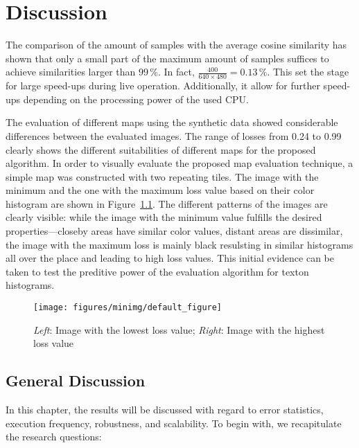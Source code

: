 \chapter{Discussion}
\label{chap:discussion}

The comparison of the amount of samples with the average cosine
similarity has shown that only a small part of the maximum amount of
samples suffices to achieve similarities larger than $99\,\%$. In
fact, $\frac{400}{640 \times 480} = 0.13\,\%$. This set the stage for
large speed-ups during live operation. Additionally, it allow for further speed-ups depending on the processing power of the used
CPU.

The evaluation of different maps using the synthetic data showed
considerable differences between the evaluated images. The range of
losses from 0.24 to 0.99 clearly shows the different suitabilities of different maps for the proposed algorithm. In order to visually evaluate the
proposed map evaluation technique, a simple map was constructed with
two repeating tiles. The image with the minimum and the one with the
maximum loss value based on their color histogram are shown in
Figure~\ref{fig:minmaximg}. The different patterns of the images are
clearly visible: while the image with the minimum value fulfills the
desired properties---closeby areas have similar color values, distant
areas are dissimilar, the image with the maximum loss is mainly black
resulsting in similar histograms all over the place and leading to
high loss values. This initial evidence can be taken to test the
preditive power of the evaluation algorithm for texton histograms.

\begin{figure}[h!]
\begin{center}
\texttt{[image: figures/minimg/default\_figure]}
\caption{{\label{fig:minmaximg} \emph{Left}: Image with the lowest loss value; \emph{Right}:
    Image with the highest loss value%
}}
\end{center}
\end{figure}

\section{General Discussion}
\label{sec:generaldiscussion}

In this chapter, the results will be discussed with regard to error
statistics, execution frequency, robustness, and scalability. To begin
with, we recapitulate the research questions:

